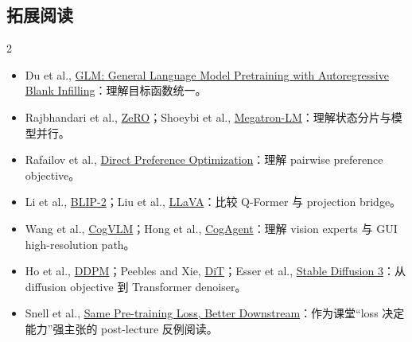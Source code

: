 \subsection{拓展阅读}

\begin{multicols}{2}
\footnotesize
\begin{itemize}
  \setlength{\itemsep}{0.15em}
  \setlength{\parskip}{0pt}
  \item Du et al., \href{https://arxiv.org/abs/2103.10360}{GLM: General Language Model Pretraining with Autoregressive Blank Infilling}：理解目标函数统一。
  \item Rajbhandari et al., \href{https://arxiv.org/abs/1910.02054}{ZeRO}；Shoeybi et al., \href{https://arxiv.org/abs/1909.08053}{Megatron-LM}：理解状态分片与模型并行。
  \item Rafailov et al., \href{https://arxiv.org/abs/2305.18290}{Direct Preference Optimization}：理解 pairwise preference objective。
  \item Li et al., \href{https://arxiv.org/abs/2301.12597}{BLIP-2}；Liu et al., \href{https://arxiv.org/abs/2304.08485}{LLaVA}：比较 Q-Former 与 projection bridge。
  \item Wang et al., \href{https://arxiv.org/abs/2311.03079}{CogVLM}；Hong et al., \href{https://arxiv.org/abs/2312.08914}{CogAgent}：理解 vision experts 与 GUI high-resolution path。
  \item Ho et al., \href{https://arxiv.org/abs/2006.11239}{DDPM}；Peebles and Xie, \href{https://arxiv.org/abs/2212.09748}{DiT}；Esser et al., \href{https://arxiv.org/abs/2403.03206}{Stable Diffusion 3}：从 diffusion objective 到 Transformer denoiser。
  \item Snell et al., \href{https://arxiv.org/abs/2409.01236}{Same Pre-training Loss, Better Downstream}：作为课堂“loss 决定能力”强主张的 post-lecture 反例阅读。
\end{itemize}
\end{multicols}


